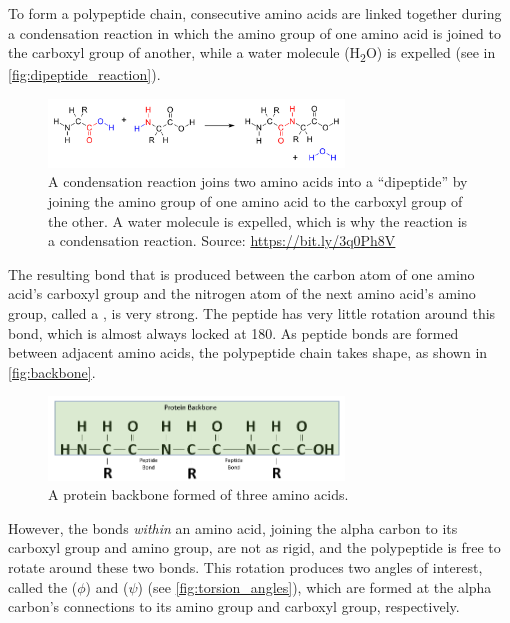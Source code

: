 To form a polypeptide chain, consecutive amino acids are linked together during a condensation reaction in which the amino group of one amino acid is joined to the carboxyl group of another, while a water molecule (H\textsubscript{2}O) is expelled (see in \autoref{fig:dipeptide_reaction}).

\begin{figure}[h]
	\centering
	\mySfFamily
	\includegraphics[width = 0.7\textwidth]{../images/dipeptide_reaction.png}
	\caption{A condensation reaction joins two amino acids into a ``dipeptide'' by joining the amino group of one amino acid to the carboxyl group of the other. A water molecule is expelled, which is why the reaction is a condensation reaction. Source: \url{https://bit.ly/3q0Ph8V}}
	\label{fig:dipeptide_reaction}
\end{figure}

The resulting bond that is produced between the carbon atom of one amino acid's carboxyl group and the nitrogen atom of the next amino acid's amino group, called a , is very strong. The peptide has very little rotation around this bond, which is almost always locked at 180\textdegree. As peptide bonds are formed between adjacent amino acids, the polypeptide chain takes shape, as shown in \autoref{fig:backbone}.

\begin{figure}[h]
	\centering
	\mySfFamily
	\includegraphics[width = 0.7\textwidth]{../images/Backbone.png}
	\caption{A protein backbone formed of three amino acids.}
	\label{fig:backbone}
\end{figure}

However, the bonds \textit{within} an amino acid, joining the alpha carbon to its carboxyl group and amino group, are not as rigid, and the polypeptide is free to rotate around these two bonds. This rotation produces two angles of interest, called the  ($\phi$) and  ($\psi$) (see \autoref{fig:torsion_angles}), which are formed at the alpha carbon's connections to its amino group and carboxyl group, respectively.

